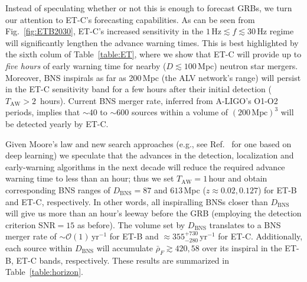 \documentclass[prd,amsmath,amssymb,aps,floats,amsfonts,notitlepage,superscriptaddress,eqsecnum,nofootinbib,10pt]{revtex4-1}
\begin{document}
Instead of speculating whether or not this is enough to forecast GRBs, we turn our attention to ET-C's forecasting capabilities.
As can be seen from Fig.~\ref{fig:ETB2030}, ET-C's increased sensitivity in the $1\,\text{Hz}\lesssim f\lesssim 30\,$Hz regime will significantly lengthen the advance warning times.
This is best highlighted by the sixth colum of Table~\ref{table:ET}, 
where we show that ET-C will provide up to \emph{five hours} of early warning time for nearby ($D\lesssim 100\,$Mpc) neutron star mergers.
Moreover, BNS inspirals as far as 200\,Mpc (the ALV network's range) will persist in the ET-C sensitivity band for a few hours after their initial detection ($T_\text{AW} > 2\,$ hours).
Current BNS merger rate, inferred from A-LIGO's O1-O2 periods, implies that $\sim 40$ to $\sim600$ sources within a volume of $(200\,\text{Mpc})^3$ will be detected yearly by ET-C.

Given Moore's law and new search approaches (e.g., see Ref.~\cite{Gabbard:2017lja} for one based on deep learning) 
we speculate that the advances in the detection, localization and early-warning algorithms in the next decade will reduce the required advance
warning time to less than an hour; thus we set $T_\text{AW} = 1\,\text{hour}$ and obtain corresponding BNS ranges of $D_\text{BNS}=87$ and $613\,$Mpc ($z\approx 0.02,0.127$) for ET-B and ET-C, respectively.
In other words, all inspiralling BNSs closer than $D_\text{BNS}$ will give us more than an hour's leeway before the GRB (employing the detection criterion $\text{SNR} =15$ as before).
The volume set by $D_\text{BNS}$ translates to a BNS merger rate of $\sim\mathcal{O}(1)\,\text{yr}^{-1}$ for ET-B and
$\approx 355^{+730}_{-280}\,\text{yr}^{-1}$ for ET-C. Additionally, each source within $D_\text{BNS}$ will accumulate $\bar\rho_F \gtrsim 420, 58$ over its inspiral
in the ET-B, ET-C bands, respectively. These results are summarized in Table~\ref{table:horizon}.
\end{document}
